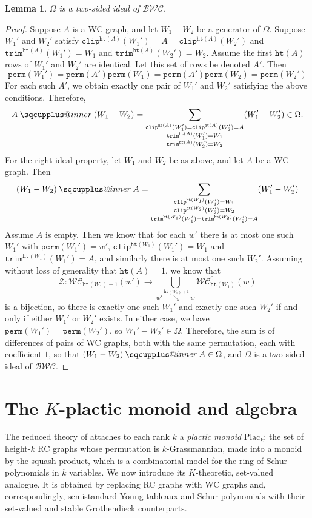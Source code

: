 \documentclass{amsart}
\makeatletter
\newcommand{\sqcupplus@inner}[2]{%
  \vcenter{\hbox{\ooalign{%
    \hfil$\m@th#1\sqcup$\hfil\cr
    \hfil\raisebox{0.15ex}{$\m@th#1\scriptscriptstyle+$}\hfil\cr
  }}}%
}
\newcommand{\sqcupplus}{\mathbin{\mathpalette\sqcupplus@inner\relax}}
\newtheorem{lemma}{Lemma}[section]
\theoremstyle{definition}
\theoremstyle{remark}
\numberwithin{equation}{subsection}
\newcommand{\downvar}[1]{\stackrel{#1}{\searrow}}
\newcommand{\wof}[1]{\mathtt{perm}(#1)}
\newcommand{\plac}{\mathrm{Plac}}
\newcommand{\trm}{\mathtt{trim}}
\newcommand{\zeromap}{\mathcal{Z}}
\newcommand{\hr}{\mathtt{ht}}
\newcommand{\clp}{\mathtt{clip}}
\newcommand{\BWC}{\mathcal{BWC}}
\newcommand{\WC}{\mathcal{WC}}
\makeatother
\begin{document}
\begin{lemma}
$\Omega$ is a two-sided ideal of $\BWC$.
\end{lemma}
\begin{proof}
Suppose $A$ is a WC graph, and let $W_1 - W_2$ be a generator of $\Omega$. Suppose $W_1'$ and $W_2'$ satisfy $\clp^{\hr(A)}(W_1') = A = \clp^{\hr(A)}(W_2')$ and $\trm^{\hr(A)}(W_1') = W_1$ and $\trm^{\hr(A)}(W_2') = W_2$. Assume the first $\hr(A)$ rows of $W_1'$ and $W_2'$ are identical. Let this set of rows be denoted $A'$. Then 
$$\wof{W_1'}=\wof{A'}\wof{W_1}=\wof{A'}\wof{W_2}=\wof{W_2'}$$ 
For each such $A'$, we obtain exactly one pair of $W_1'$ and $W_2'$ satisfying the above conditions. Therefore, 
$$A\sqcupplus(W_1-W_2) = \sum_{\substack{\clp^{\hr(A)}(W_1')=\clp^{\hr(A)}(W_2')=A\\\trm^{\hr(A)}(W_1')=W_1\\\trm^{\hr(A)}(W_2')=W_2}} (W_1' - W_2') \in \Omega.$$
For the right ideal property, let $W_1$ and $W_2$ be as above, and let $A$ be a WC graph. Then
$$(W_1-W_2)\sqcupplus A = \sum_{\substack{\clp^{\hr(W_1)}(W_1')=W_1\\\clp^{\hr(W_2)}(W_2')=W_2\\\trm^{\hr(W_1)}(W_1')=\trm^{\hr(W_2)}(W_2')=A}} (W_1' - W_2')$$
Assume $A$ is empty. Then we know that for each $w'$ there is at most one such $W_1'$ with $\wof{W_1'}=w'$, $\clp^{\hr(W_1)}(W_1')=W_1$ and $\trm^{\hr(W_1)}(W_1')=A$, and similarly there is at most one such $W_2'$. Assuming without loss of generality that $\hr(A)=1$, we know that
$$\zeromap:\WC_{\hr(W_1)+1}(w')\to \bigcup_{w'\downvar{\hr(W_1) + 1} w}\WC_{\hr(W_1)}^0(w)$$
is a bijection, so there is exactly one such $W_1'$ and exactly one such $W_2'$ if and only if either $W_1'$ or $W_2'$ exists. In either case, we have $\wof{W_1'}=\wof{W_2'}$, so $W_1'-W_2'\in\Omega$. Therefore, the sum is of differences of pairs of WC graphs, both with the same permutation, each with coefficient $1$, so that $(W_1-W_2)\sqcupplus A\in\Omega$, and $\Omega$ is a two-sided ideal of $\BWC$.
\end{proof}

\section{The \texorpdfstring{$K$}{K}-plactic monoid and algebra}
\label{section:kplactic}

The reduced theory of \cite{samuelmolev} attaches to each rank $k$ a
\emph{plactic monoid} $\plac_k$: the set of height-$k$ RC graphs whose
permutation is $k$-Grassmannian, made into a monoid by the squash product, which
is a combinatorial model for the ring of Schur polynomials in $k$ variables. We
now introduce its $K$-theoretic, set-valued analogue. It is obtained by replacing
RC graphs with WC graphs and, correspondingly, semistandard Young tableaux and
Schur polynomials with their set-valued and stable Grothendieck counterparts.
\end{document}
